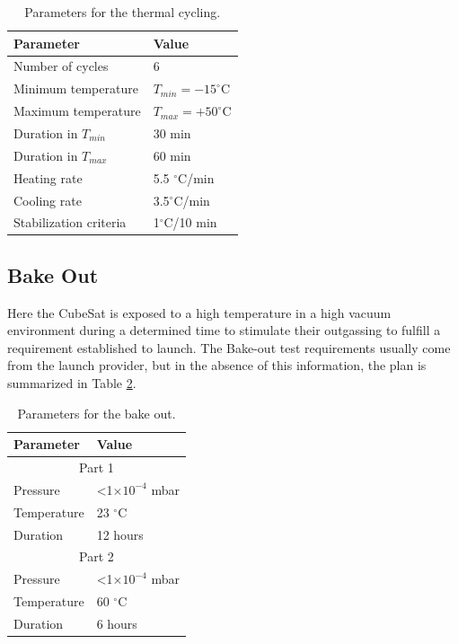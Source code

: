 \begin{table}[!htb]
    \centering
    \begin{tabular}{ll}
        \toprule[1.5pt]
        \textbf{Parameter} & \textbf{Value} \\
        \midrule
        Number of cycles        & 6 \\
        Minimum temperature     & $T_{min}=-15 ^\circ$C \\
        Maximum temperature     & $T_{max}=+50 ^\circ$C \\
        Duration in $T_{min}$   & 30 min \\
        Duration in $T_{max}$   & 60 min \\
        Heating rate            & 5.5 $^\circ$C/min \\
        Cooling rate            & 3.5$^\circ$C/min \\
        Stabilization criteria  & 1$^\circ$C/10 min \\
        \bottomrule[1.5pt]
	\end{tabular}
    \caption{Parameters for the thermal cycling.}
    \label{tab:thermal_cycling}
\end{table}

\subsection{Bake Out}

Here the CubeSat is exposed to a high temperature in a high vacuum environment during a determined time to stimulate their outgassing to fulfill a requirement established to launch. The Bake-out test requirements usually come from the launch provider, but in the absence of this information, the plan is summarized in Table \ref{tab:bakeout_cycling}. %

\begin{table}[!htb]
    \centering
    \begin{tabular}{ll}
    \toprule[1.5pt]
    \textbf{Parameter} & \textbf{Value} \\
    \midrule
    \multicolumn{2}{c}{Part 1} \\
    \midrule
    Pressure           & <1$\times 10^{-4}$ mbar \\
    Temperature        & 23 $^\circ$C \\
    Duration           & 12 hours \\
    \midrule
    \multicolumn{2}{c}{Part 2} \\
    \midrule
    Pressure           & <1$\times 10^{-4}$ mbar \\
    Temperature        & 60 $^\circ$C \\
    Duration           & 6 hours \\
    \bottomrule[1.5pt]
    \end{tabular}
    \caption{Parameters for the bake out.}
    \label{tab:bakeout_cycling}
\end{table}

